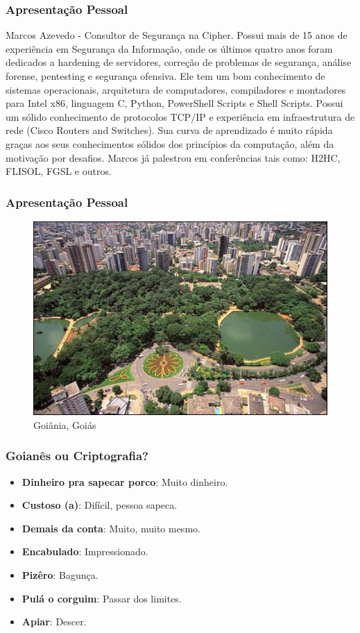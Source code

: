 \documentclass[compress]{beamer}
\begin{document}

\begin{frame}
\frametitle{Apresentação Pessoal}
	\justifying
		Marcos Azevedo - Consultor de Segurança na Cipher. Possui mais de 15 anos de experiência em Segurança da Informação, onde os últimos quatro anos foram dedicados a hardening de servidores, correção de problemas de segurança, análise forense, pentesting e segurança ofensiva. Ele tem um bom conhecimento de sistemas operacionais, arquitetura de computadores, compiladores e montadores para Intel x86, linguagem C, Python, PowerShell Scripts e Shell Scripts. Possui um sólido conhecimento de protocolos TCP/IP e experiência em infraestrutura de rede (Cisco Routers and Switches). Sua curva de aprendizado é muito rápida graças aos seus conhecimentos sólidos dos princípios da computação, além da motivação por desafios. Marcos já palestrou em conferências tais como: H2HC, FLISOL, FGSL e outros.
\end{frame}

\begin{frame}
\frametitle{Apresentação Pessoal}
	\begin{figure}[h]
		\caption{Goiânia, Goiás}
		\includegraphics[width=\textwidth]{pics/goiania}
	\end{figure}
\end{frame}

\begin{frame}
\frametitle{Goianês ou Criptografia?}
	\begin{itemize}
		\justifying
		\item<+->{\textbf{Dinheiro pra sapecar porco}: Muito dinheiro.}
		\item<+->{\textbf{Custoso (a)}: Difícil, pessoa sapeca.}
		\item<+->{\textbf{Demais da conta}: Muito, muito mesmo.}
		\item<+->{\textbf{Encabulado}: Impressionado.}
		\item<+->{\textbf{Pizêro}: Bagunça.}
		\item<+->{\textbf{Pulá o corguim}: Passar dos limites.}
		\item<+->{\textbf{Apiar}: Descer.}
	\end{itemize}
\end{frame}
\end{document}
